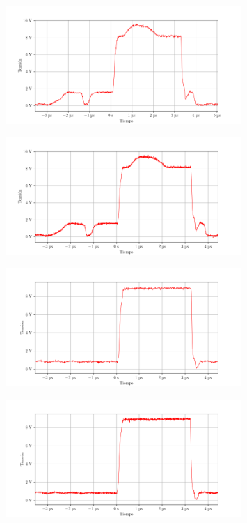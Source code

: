 \begin{figure}[ht]
    \centering
    \includegraphics[width=0.8\textwidth]{images/capturas-osciloscopio/17-11-2022/1.png}
    \caption{}
    \label{fig:osc:1}
\end{figure}

\begin{figure}[ht]
    \centering
    \includegraphics[width=0.8\textwidth]{images/capturas-osciloscopio/17-11-2022/2.png}
    \caption{}
    \label{fig:osc:2}
\end{figure}

\begin{figure}[ht]
    \centering
    \includegraphics[width=0.8\textwidth]{images/capturas-osciloscopio/17-11-2022/3.png}
    \caption{}
    \label{fig:osc:3}
\end{figure}

\begin{figure}[ht]
    \centering
    \includegraphics[width=0.8\textwidth]{images/capturas-osciloscopio/17-11-2022/4.png}
    \caption{}
    \label{fig:osc:4}
\end{figure}

